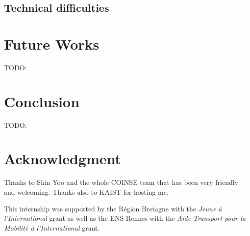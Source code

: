 \documentclass{llncs2e/llncs}
\def\todo#1{{\color{red}TODO:\quad#1}}
\begin{document}
\subsection{Technical difficulties}
\label{tech_difficulties}





\section{Future Works}
\label{futureworks}
\todo{}

\cite{gligoric2011smutant,haupt2011type,steinert2010continuous,yoo2012regression}%
\cite{chugh2012nested}%
\cite{chambers1991iterative}%

\cite{hayes1994testing}%

\cite{bottaci2010type} %

\section{Conclusion}
\label{conclusion}
\todo{}


\section*{Acknowledgment}
Thanks to Shin Yoo and the whole COINSE team that has been very friendly and
welcoming. Thanks also to KAIST for hosting me.

This internship was supported by the R\'egion Bretagne with the \textit{Jeune
\`a l'International} grant as well as the ENS Rennes with the \textit{Aide
Transport pour la Mobilit\'e \`a l'International} grant.



\end{document}

